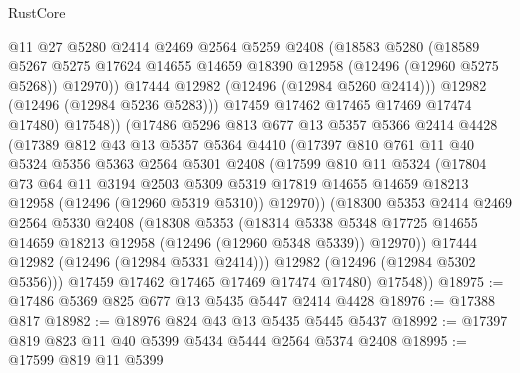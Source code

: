 \begin{lexlean}{RustCore}
\begin{coremodule}
                @11
                @27
                @5280
                @2414
                @2469
                @2564
                @5259
                @2408
                (@18583
                  @5280
                  (@18589
                    @5267
                    @5275
                    @17624
                    @14655
                    @14659
                    @18390
                    @12958
                    (@12496 (@12960 @5275 @5268))
                    @12970))
                @17444
                @12982
                (@12496 (@12984 @5260 @2414)))
              @12982
              (@12496 (@12984 @5236 @5283)))
            @17459
            @17462
            @17465
            @17469
            @17474
            @17480)
          @17548))
      (@17486
        @5296
        @813
        @677
        @13
        @5357
        @5366
        @2414
        @4428
        (@17389
          @812
          @43
          @13
          @5357
          @5364
          @4410
          (@17397
            @810
            @761
            @11
            @40
            @5324
            @5356
            @5363
            @2564
            @5301
            @2408
            (@17599
              @810
              @11
              @5324
              (@17804
                @73
                @64
                @11
                @3194
                @2503
                @5309
                @5319
                @17819
                @14655
                @14659
                @18213
                @12958
                (@12496 (@12960 @5319 @5310))
                @12970))
            (@18300
              @5353
              @2414
              @2469
              @2564
              @5330
              @2408
              (@18308
                @5353
                (@18314
                  @5338
                  @5348
                  @17725
                  @14655
                  @14659
                  @18213
                  @12958
                  (@12496 (@12960 @5348 @5339))
                  @12970))
              @17444
              @12982
              (@12496 (@12984 @5331 @2414)))
            @12982
            (@12496 (@12984 @5302 @5356)))
          @17459
          @17462
          @17465
          @17469
          @17474
          @17480)
        @17548))
@18975 := @17486 @5369 @825 @677 @13 @5435 @5447 @2414 @4428
@18976 := @17388 @817
@18982 := @18976 @824 @43 @13 @5435 @5445 @5437
@18992 := @17397 @819 @823 @11 @40 @5399 @5434 @5444 @2564 @5374 @2408
@18995 := @17599 @819 @11 @5399

\end{coremodule}
\end{lexlean}
